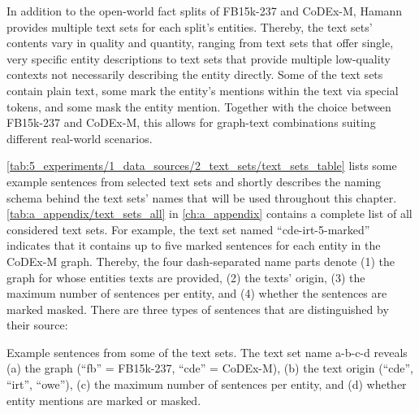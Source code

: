 In addition to the open-world fact splits of FB15k-237 and CoDEx-M, Hamann provides multiple text sets for each split's entities. Thereby, the text sets' contents vary in quality and quantity, ranging from text sets that offer single, very specific entity descriptions to text sets that provide multiple low-quality contexts not necessarily describing the entity directly. Some of the text sets contain plain text, some mark the entity's mentions within the text via special tokens, and some mask the entity mention. Together with the choice between FB15k-237 and CoDEx-M, this allows for graph-text combinations suiting different real-world scenarios.

\autoref{tab:5_experiments/1_data_sources/2_text_sets/text_sets_table} lists some example sentences from selected text sets and shortly describes the naming schema behind the text sets' names that will be used throughout this chapter. \autoref{tab:a_appendix/text_sets_all} in \autoref{ch:a_appendix} contains a complete list of all considered text sets. For example, the text set named ``cde-irt-5-marked'' indicates that it contains up to five marked sentences for each entity in the CoDEx-M graph. Thereby, the four dash-separated name parts denote (1) the graph for whose entities texts are provided, (2) the texts' origin, (3) the maximum number of sentences per entity, and (4) whether the sentences are marked masked. There are three types of sentences that are distinguished by their source:

\begin{table}
    \makebox[\textwidth][c]{
        
    }
    \caption{Example sentences from some of the text sets. The text set name a-b-c-d reveals (a) the graph (``fb'' = FB15k-237, ``cde'' = CoDEx-M), (b) the text origin (``cde'', ``irt'', ``owe''), (c) the maximum number of sentences per entity, and (d) whether entity mentions are marked or masked.}
    \label{tab:5_experiments/1_data_sources/2_text_sets/text_sets_table}
\end{table}


